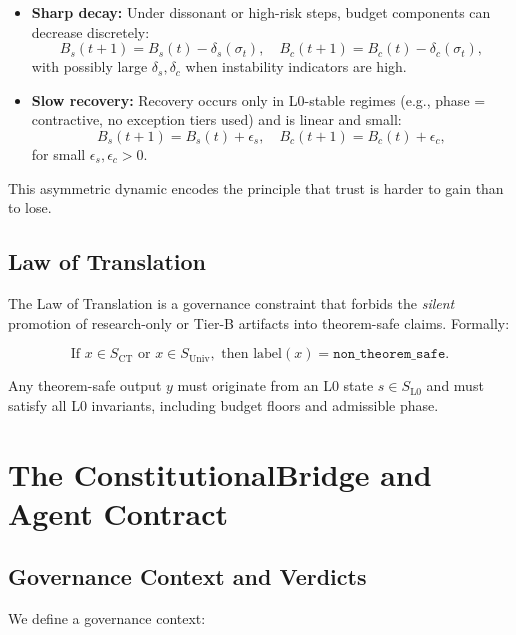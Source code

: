 \documentclass[11pt]{article}
\begin{document}
\begin{itemize}[itemsep=2pt]
  \item \textbf{Sharp decay:} Under dissonant or high-risk steps, budget components can decrease discretely:
  \begin{equation}
    B_s(t+1) = B_s(t) - \delta_s(\sigma_t), \quad B_c(t+1) = B_c(t) - \delta_c(\sigma_t),
  \end{equation}
  with possibly large \(\delta_s, \delta_c\) when instability indicators are high.
  \item \textbf{Slow recovery:} Recovery occurs only in L0-stable regimes (e.g., phase = contractive, no exception tiers used) and is linear and small:
  \begin{equation}
    B_s(t+1) = B_s(t) + \epsilon_s, \quad B_c(t+1) = B_c(t) + \epsilon_c,
  \end{equation}
  for small \(\epsilon_s, \epsilon_c > 0\).
\end{itemize}

This asymmetric dynamic encodes the principle that trust is harder to gain than to lose.

\subsection{Law of Translation}

The Law of Translation is a governance constraint that forbids the \emph{silent} promotion of research-only or Tier-B artifacts into theorem-safe claims. Formally:

\begin{equation}
  \text{If } x \in S_{\mathrm{CT}} \text{ or } x \in S_{\mathrm{Univ}}, \text{ then } \text{label}(x) = \texttt{non\_theorem\_safe}.
\end{equation}

Any theorem-safe output \(y\) must originate from an L0 state \(s \in S_{\mathrm{L0}}\) and must satisfy all L0 invariants, including budget floors and admissible phase.

\section{The ConstitutionalBridge and Agent Contract}

\subsection{Governance Context and Verdicts}

We define a governance context:
\end{document}
